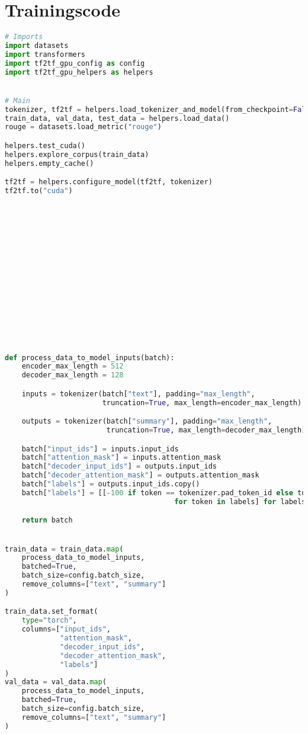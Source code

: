 \section*{Trainingscode}
\begin{lstlisting}[language=Python, caption=Trainingscode]
# Imports
import datasets
import transformers
import tf2tf_gpu_config as config
import tf2tf_gpu_helpers as helpers


# Main
tokenizer, tf2tf = helpers.load_tokenizer_and_model(from_checkpoint=False)
train_data, val_data, test_data = helpers.load_data()
rouge = datasets.load_metric("rouge")

helpers.test_cuda()
helpers.explore_corpus(train_data)
helpers.empty_cache()

tf2tf = helpers.configure_model(tf2tf, tokenizer)
tf2tf.to("cuda")
















def process_data_to_model_inputs(batch):
    encoder_max_length = 512
    decoder_max_length = 128

    inputs = tokenizer(batch["text"], padding="max_length",
                       truncation=True, max_length=encoder_max_length)

    outputs = tokenizer(batch["summary"], padding="max_length",
                        truncation=True, max_length=decoder_max_length)

    batch["input_ids"] = inputs.input_ids
    batch["attention_mask"] = inputs.attention_mask
    batch["decoder_input_ids"] = outputs.input_ids
    batch["decoder_attention_mask"] = outputs.attention_mask
    batch["labels"] = outputs.input_ids.copy()
    batch["labels"] = [[-100 if token == tokenizer.pad_token_id else token
    									for token in labels] for labels in batch["labels"]]

    return batch


train_data = train_data.map(
    process_data_to_model_inputs,
    batched=True,
    batch_size=config.batch_size,
    remove_columns=["text", "summary"]
)

train_data.set_format(
    type="torch",
    columns=["input_ids",
             "attention_mask",
             "decoder_input_ids",
             "decoder_attention_mask",
             "labels"]
)
val_data = val_data.map(
    process_data_to_model_inputs,
    batched=True,
    batch_size=config.batch_size,
    remove_columns=["text", "summary"]
)


\end{lstlisting}
